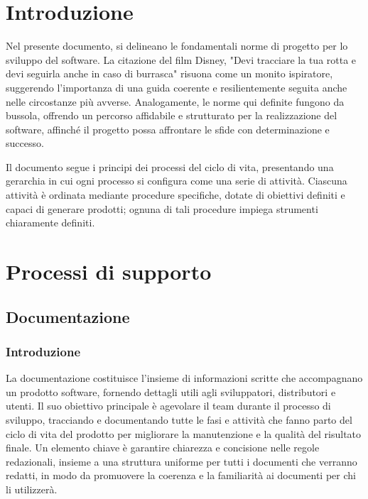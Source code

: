 \documentclass{article}
\begin{document}
\pagebreak

\maketitle
\thispagestyle{fancy}
\tableofcontents
{}
\pagebreak


\flushleft
\section{Introduzione}
Nel presente documento, si delineano le fondamentali norme di progetto per lo sviluppo del software. La citazione del film Disney, "Devi tracciare la tua rotta e devi seguirla anche in caso di burrasca" risuona come un monito ispiratore, suggerendo l'importanza di una guida coerente e resilientemente seguita anche nelle circostanze più avverse. Analogamente, le norme qui definite fungono da bussola, offrendo un percorso affidabile e strutturato per la realizzazione del software, affinché il progetto possa affrontare le sfide con determinazione e successo.

Il documento segue i principi dei processi del ciclo di vita, presentando una gerarchia in cui ogni processo si configura come una serie di attività. Ciascuna attività è ordinata mediante procedure specifiche, dotate di obiettivi definiti e capaci di generare prodotti; ognuna di tali procedure impiega strumenti chiaramente definiti.

\section{Processi di supporto}

\subsection{Documentazione}
    
    \subsubsection{Introduzione}
    La documentazione costituisce l'insieme di informazioni scritte che accompagnano un prodotto software, fornendo dettagli utili agli sviluppatori, distributori e utenti. Il suo obiettivo principale è agevolare il team durante il processo di sviluppo, tracciando e documentando tutte le fasi e attività che fanno parto del ciclo di vita del prodotto per migliorare la manutenzione e la qualità del risultato finale. Un elemento chiave è garantire chiarezza e concisione nelle regole redazionali, insieme a una struttura uniforme per tutti i documenti che verranno redatti, in modo da promuovere la coerenza e la familiarità ai documenti per chi li utilizzerà. 
    
\end{document}
